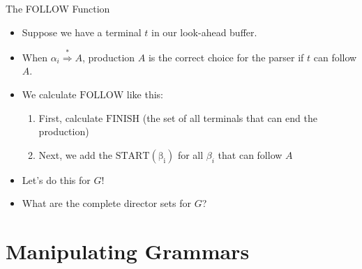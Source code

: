 \documentclass[]{beamer}
\begin{document}
\begin{frame}{The FOLLOW Function}
  \begin{itemize}[<+->]
    \item Suppose we have a terminal $t$ in our look-ahead buffer.
    \item When $\alpha_i \stackrel{*}{\Rightarrow} A$, production $A$ is the correct choice for the parser if $t$ can follow $A$.
    \item We calculate $\mathrm{FOLLOW}$ like this:
    \begin{enumerate}
      \item First, calculate $\mathrm{FINISH}$ (the set of all terminals that can end the production)
      \item Next, we add the $\mathrm{START(\beta_i)}$ for all $\beta_i$ that can follow $A$
    \end{enumerate}
    \item Let's do this for $G$!
    \item What are the complete director sets for $G$?
  \end{itemize}
\end{frame}

\section{Manipulating Grammars}
\end{document}
